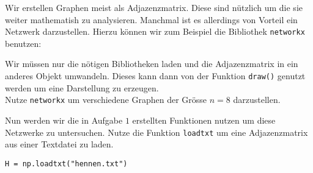 

\exercise[%
  topic=Netzwerke mit Python darstellen
    ]

Wir erstellen Graphen meist als Adjazenzmatrix. Diese sind nützlich um die sie weiter mathematish zu analysieren. Manchmal ist es allerdings von Vorteil ein Netzwerk darzustellen. Hierzu können wir zum Beispiel die Bibliothek {\tt networkx} benutzen:  



Wir müssen nur die nötigen Bibliotheken laden und die Adjazenzmatrix in ein anderes Objekt umwandeln. Dieses kann dann von der Funktion {\tt draw()} genutzt werden um eine Darstellung zu erzeugen.\\
Nutze {\tt networkx} um verschiedene Graphen der Grösse $n=8$ darzustellen.

  \exercise[%
  topic=Netzwerke mit Python untersuchen
    ]
Nun werden wir die in Aufgabe $1$ erstellten Funktionen nutzen um diese Netzwerke zu untersuchen. Nutze die Funktion {\tt loadtxt} um eine Adjazenzmatrix aus einer Textdatei zu laden.

\begin{lstlisting}
H = np.loadtxt("hennen.txt")
\end{lstlisting}

